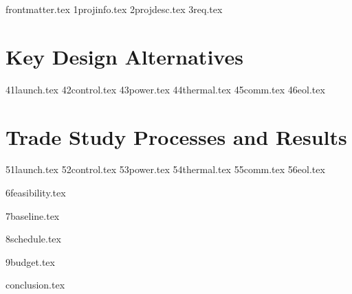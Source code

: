 \documentclass{ece}
\begin{document}
{frontmatter.tex}
{1projinfo.tex}
{2projdesc.tex} 
{3req.tex}

\section{Key Design Alternatives}
{41launch.tex}
{42control.tex}
{43power.tex}
{44thermal.tex}
{45comm.tex}
{46eol.tex}

\section{Trade Study Processes and Results}

{51launch.tex}
{52control.tex}
{53power.tex}
{54thermal.tex}
{55comm.tex}
{56eol.tex}

{6feasibility.tex}

{7baseline.tex}

{8schedule.tex}

{9budget.tex}

{conclusion.tex}

\pagebreak
%   
%
%
%
%
\printbibliography[heading=none]
\end{document}
